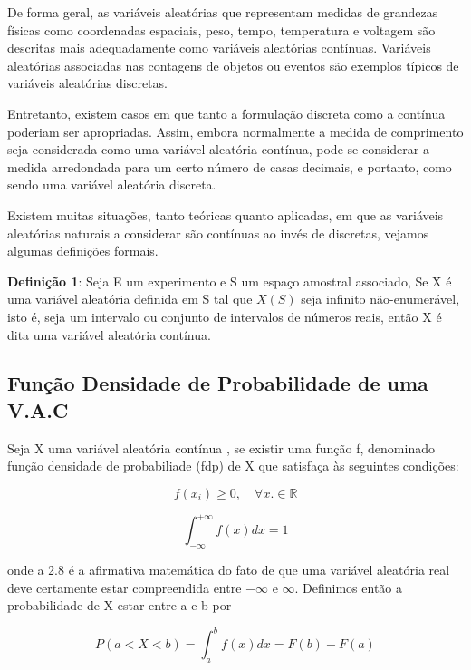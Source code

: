 De forma geral, as variáveis aleatórias que representam medidas de
grandezas físicas como coordenadas espaciais, peso, tempo,
temperatura e voltagem são descritas mais adequadamente como
variáveis aleatórias contínuas. Variáveis aleatórias associadas
nas contagens de objetos ou eventos são exemplos típicos de
variáveis aleatórias discretas.\vskip0.3cm

Entretanto, existem casos em que tanto a formulação discreta como
a contínua poderiam ser apropriadas. Assim, embora normalmente a
medida de comprimento seja considerada como uma variável aleatória
contínua, pode-se considerar a medida arredondada para um certo
número de casas decimais, e portanto, como sendo uma variável
aleatória discreta.\vskip0.3cm


Existem muitas situações, tanto teóricas quanto aplicadas, em que
as variáveis aleatórias naturais a considerar são contínuas ao
invés de discretas, vejamos algumas definições formais.\vskip0.3cm


\textbf{Definição 1}: Seja E um experimento e S um espaço amostral
associado, Se X é uma variável aleatória definida em S tal que
$X(S)$ seja infinito não-enumerável, isto é, seja um intervalo ou
conjunto de intervalos de números reais, então X é dita uma
variável aleatória contínua.



\subsection{Função Densidade de Probabilidade de uma V.A.C}

Seja X uma variável aleatória contínua , se existir uma função f,
denominado função densidade de probabiliade (fdp) de X que
satisfaça às seguintes condições:


\begin{equation}\label{}
    f(x_{i}) \geq 0, \quad \forall x.\in \mathbb{R}
\end{equation}


\begin{equation}\label{}
    \int^{+\infty}_{-\infty}f(x)dx=1
\end{equation}

onde a 2.8 é a afirmativa matemática do fato de que uma variável
aleatória real deve certamente estar compreendida entre $-\infty$
e $\infty$. Definimos então a probabilidade de X estar entre a e b
por

\begin{equation}\label{}
    P(a< X < b)=\int_{a}^{b}f(x)dx = F(b)-F(a)
\end{equation}


